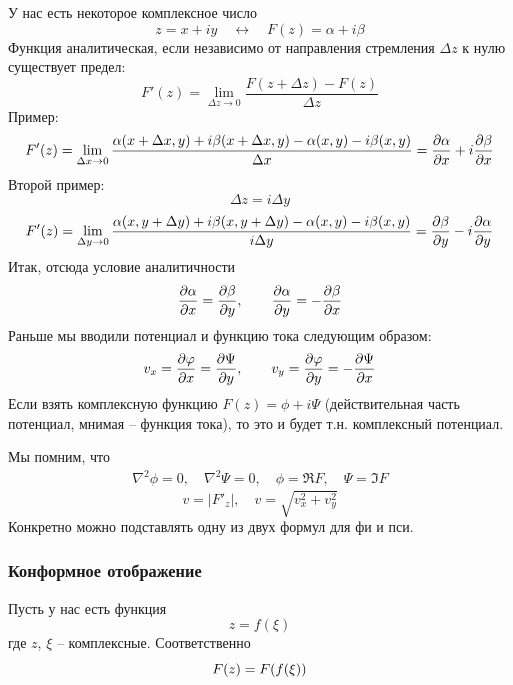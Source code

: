 У нас есть некоторое комплексное число
\begin{equation}
	z=x+iy 
	\quad \leftrightarrow \quad
	F(z)=\alpha+i \beta
\end{equation}
Функция аналитическая, если независимо от направления стремления $\Delta z$ к нулю существует предел:
\begin{equation}
	F'(z)=\lim\limits_{\Delta z\to0}\frac{F(z+\Delta z)-F(z)}{\Delta z}
\end{equation}
Пример:
\begin{equation}
	F'(z)=\lim\limits_{\Delta x\to0}\frac{\alpha(x+\Delta x,y)+i\beta(x+\Delta x,y)-\alpha(x,y)-i\beta(x,y)}{\Delta x}=
		\pdv{\alpha}{x}+i\pdv{\beta}{x}
\end{equation}
Второй пример:
\begin{equation}
	\Delta z=i\Delta y
\end{equation}
\begin{equation}
	F'(z)=\lim\limits_{\Delta y\to0}\frac{\alpha(x,y+\Delta y)+i\beta(x,y+\Delta y)-\alpha(x,y)-i\beta(x,y)}{i\Delta y}=
		\pdv{\beta}{y}-i\pdv{\alpha}{y}
\end{equation}
Итак, отсюда условие аналитичности
\begin{gather}
	\label{eq2}
	\pdv{\alpha}{x}=\pdv{\beta}{y}, \qquad
	\pdv{\alpha}{y}=-\pdv{\beta}{x}
\end{gather}
Раньше мы вводили потенциал и функцию тока следующим образом:
\begin{gather}
	\label{eq3}
	v_x=\pdv{\varphi}{x}=\pdv{\Psi}{y}, \qquad
	v_y=\pdv{\varphi}{y}=-\pdv{\Psi}{x}
\end{gather}
Если взять комплексную функцию $F(z)=\phi+i\Psi$ (действительная часть потенциал, мнимая --  функция тока), то это и будет т.н. комплексный потенциал.

Мы помним, что
\begin{gather}
	\nabla^2\phi=0,\quad
	\nabla^2\Psi=0,\quad
	\phi=\Re{F},\quad
	\Psi=\Im{F}
\end{gather}
\begin{equation}
	v=|F'_z|, \quad
	v=\sqrt{v_x^2+v_y^2}
\end{equation}
Конкретно можно подставлять одну из двух формул для фи и пси.

\subsubsection{Конформное отображение}
Пусть у нас есть функция
\begin{equation}
	z=f(\xi)
\end{equation}
где $z$, $\xi$ -- комплексные. Соответственно
\begin{equation}
	F(z)=F\qty(f(\xi))
\end{equation}

